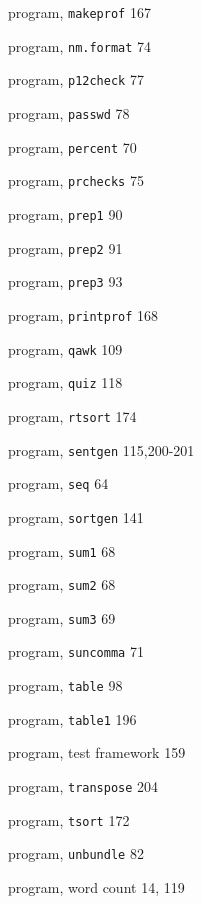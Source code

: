 \begin{multicols}{3}
\hangindent=3pc  program, \verb'makeprof' 167

\hangindent=3pc  program, \verb'nm.format' 74

\hangindent=3pc  program, \verb'p12check' 77

\hangindent=3pc  program, \verb'passwd' 78

\hangindent=3pc  program, \verb'percent' 70

\hangindent=3pc  program, \verb'prchecks' 75

\hangindent=3pc  program, \verb'prep1' 90

\hangindent=3pc  program, \verb'prep2' 91

\hangindent=3pc  program, \verb'prep3' 93

\hangindent=3pc  program, \verb'printprof' 168

\hangindent=3pc  program, \verb'qawk' 109

\hangindent=3pc  program, \verb'quiz' 118

\hangindent=3pc  program, \verb'rtsort' 174

\hangindent=3pc  program, \verb'sentgen' 115,200-201

\hangindent=3pc  program, \verb'seq' 64

\hangindent=3pc  program, \verb'sortgen' 141

\hangindent=3pc  program, \verb'sum1' 68

\hangindent=3pc  program, \verb'sum2' 68

\hangindent=3pc  program, \verb'sum3' 69



\hangindent=3pc  program, \verb'suncomma' 71

\hangindent=3pc  program, \verb'table' 98

\hangindent=3pc  program, \verb'table1' 196

\hangindent=3pc  program, test framework 159

\hangindent=3pc  program, \verb'transpose' 204

\hangindent=3pc  program, \verb'tsort' 172

\hangindent=3pc  program, \verb'unbundle' 82

\hangindent=3pc  program, word count 14, 119


\end{multicols}

